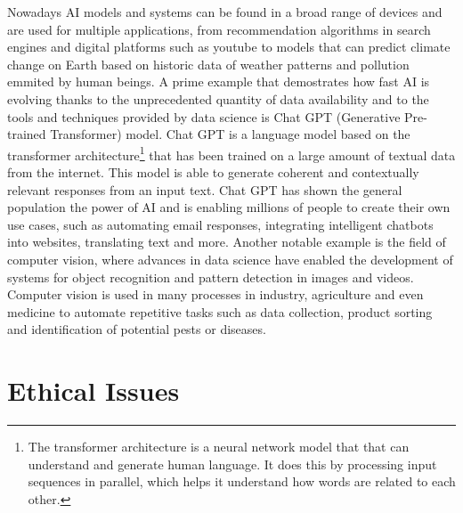 \documentclass{vgtc}                          %
\begin{document}
Nowadays AI models and systems can be found in a broad range of devices and are used for multiple applications, from recommendation algorithms in search engines and digital platforms such as youtube to 
models that can predict climate change on Earth based on historic data of weather patterns and pollution emmited by human beings. A prime example that demostrates how fast AI is evolving 
thanks to the unprecedented quantity of data availability and to the tools and techniques provided by data science is Chat GPT (Generative Pre-trained Transformer) model. Chat GPT is a language model 
based on the transformer architecture\footnote{The transformer architecture is a neural network model that that can understand and generate human language. It does this by processing input sequences in 
parallel, which helps it understand how words are related to each other.} that has been trained on a large amount of textual data from the internet. This model is able to generate coherent and contextually 
relevant responses from an input text. Chat GPT has shown the general population the power of AI and is enabling millions of people to create their own use cases, such as automating email responses, 
integrating intelligent chatbots into websites, translating text and more. Another notable example is the field of computer vision, where advances in data science have enabled the 
development of systems for object recognition and pattern detection in images and videos. Computer vision is used in many processes in industry, agriculture and even medicine to automate repetitive tasks 
such as data collection, product sorting and identification of potential pests or diseases.

\section{Ethical Issues}
\end{document}
